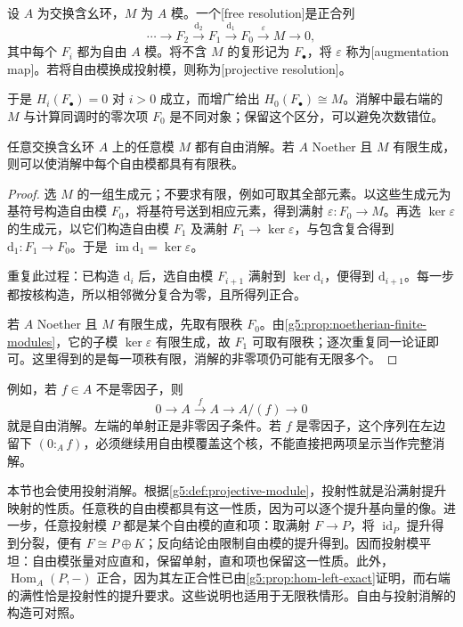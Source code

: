 \begin{definition}\label{g5:def:free-resolution}
	设 \(A\) 为交换含幺环，\(M\) 为 \(A\) 模。一个[free resolution]是正合列
	\[
		\cdots\longrightarrow F_2\xrightarrow{\mathrm{d}_2}F_1
		\xrightarrow{\mathrm{d}_1}F_0\xrightarrow{\varepsilon}M
		\longrightarrow0,
	\]
	其中每个 \(F_i\) 都为自由 \(A\) 模。将不含 \(M\) 的复形记为 \(F_\bullet\)，将 \(\varepsilon\) 称为[augmentation map]。若将自由模换成投射模，则称为[projective resolution]。
\end{definition}

于是 \(H_i(F_\bullet)=0\) 对 \(i>0\) 成立，而增广给出 \(H_0(F_\bullet)\cong M\)。消解中最右端的 \(M\) 与计算同调时的零次项 \(F_0\) 是不同对象；保留这个区分，可以避免次数错位。

\begin{proposition}\label{g5:prop:free-resolution-exists}
	任意交换含幺环 \(A\) 上的任意模 \(M\) 都有自由消解。若 \(A\) Noether 且 \(M\) 有限生成，则可以使消解中每个自由模都具有有限秩。
\end{proposition}
\begin{proof}
	选 \(M\) 的一组生成元；不要求有限，例如可取其全部元素。以这些生成元为基符号构造自由模 \(F_0\)，将基符号送到相应元素，得到满射 \(\varepsilon:F_0\to M\)。再选 \(\ker\varepsilon\) 的生成元，以它们构造自由模 \(F_1\) 及满射 \(F_1\to\ker\varepsilon\)，与包含复合得到 \(\mathrm{d}_1:F_1\to F_0\)。于是 \(\operatorname{im}\mathrm{d}_1=\ker\varepsilon\)。

	重复此过程：已构造 \(\mathrm{d}_i\) 后，选自由模 \(F_{i+1}\) 满射到 \(\ker \mathrm{d}_i\)，便得到 \(\mathrm{d}_{i+1}\)。每一步都按核构造，所以相邻微分复合为零，且所得列正合。

	若 \(A\) Noether 且 \(M\) 有限生成，先取有限秩 \(F_0\)。由\cref{g5:prop:noetherian-finite-modules}，它的子模 \(\ker\varepsilon\) 有限生成，故 \(F_1\) 可取有限秩；逐次重复同一论证即可。这里得到的是每一项秩有限，消解的非零项仍可能有无限多个。
\end{proof}

例如，若 \(f\in A\) 不是零因子，则
\[
	0\longrightarrow A\xrightarrow{\,f\,}A
	\longrightarrow A/(f)\longrightarrow0
\]
就是自由消解。左端的单射正是非零因子条件。若 \(f\) 是零因子，这个序列在左边留下 \((0:_A f)\)，必须继续用自由模覆盖这个核，不能直接把两项呈示当作完整消解。

\ProseParagraphBreak

本节也会使用投射消解。根据\cref{g5:def:projective-module}，投射性就是沿满射提升映射的性质。任意秩的自由模都具有这一性质，因为可以逐个提升基向量的像。进一步，任意投射模 \(P\) 都是某个自由模的直和项：取满射 \(F\to P\)，将 \(\operatorname{id}_P\) 提升得到分裂，便有 \(F\cong P\oplus K\)；反向结论由限制自由模的提升得到。因而投射模平坦：自由模张量对应直和，保留单射，直和项也保留这一性质。此外，\(\operatorname{Hom}_A(P,-)\) 正合，因为其左正合性已由\cref{g5:prop:hom-left-exact}证明，而右端的满性恰是投射性的提升要求。这些说明也适用于无限秩情形。自由与投射消解的构造可对照\cite[附录B，第277--278页]{Matsumura1989}。

